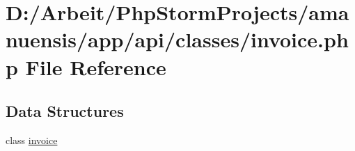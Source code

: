 \hypertarget{invoice_8php}{}\section{D\+:/\+Arbeit/\+Php\+Storm\+Projects/amanuensis/app/api/classes/invoice.php File Reference}
\label{invoice_8php}
\subsection*{Data Structures}
\begin{DoxyCompactItemize}
\item 
class \hyperlink{classinvoice}{invoice}
\end{DoxyCompactItemize}
